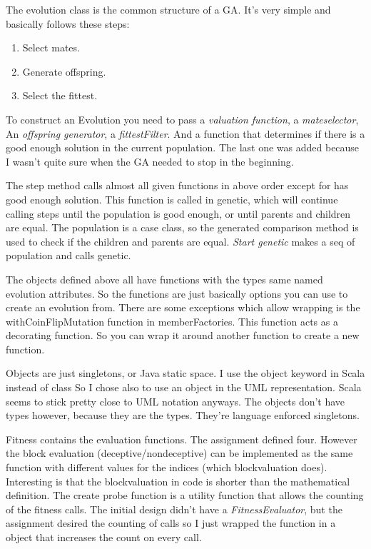 \documentclass{article}
\begin{document}
\begin{empfile}
The evolution class is the common structure of a GA{.} It's very simple and
basically follows these steps:
\begin{enumerate}
	\item Select mates.
	\item Generate offspring.
	\item Select the fittest.
\end{enumerate}

To construct an Evolution you need to pass a \emph{valuation function},
a \emph{mateselector}, An \emph{offspring generator}, 
a \emph{fittestFilter}. And a function that determines if there
is a good enough solution in the current population. The last one was added
because I wasn't quite sure when the GA needed to stop in the beginning.

The step method calls almost all given functions in above order except for has good
enough solution. This function is called in genetic, which will continue
calling steps until the population is good enough, or until parents
and children are equal. The population is a case class, so
the generated comparison method is used to check if the children and parents
are equal. \emph{Start genetic} makes a seq of population and calls genetic.

The objects defined above all have functions with the types same named evolution
attributes. So the functions are just basically options you can use to create an
evolution from. There are some exceptions which allow wrapping is the
withCoinFlipMutation function in
memberFactories. This function acts as a decorating function. So you can wrap
it around another function to create a new function.

Objects are just singletons, or Java static space. I use the object keyword in
Scala instead of class So I chose also to use an object in the UML
representation. Scala seems to stick pretty close to UML notation anyways.
The objects don't have types however, because they are the types. They're
language enforced singletons.

Fitness contains the evaluation functions. The assignment defined four. However
the block evaluation (deceptive/nondeceptive) can be implemented as the
same function with different values for the indices (which blockvaluation 
does). Interesting is that the blockvaluation in code is shorter than the
mathematical definition.
The create probe function is a utility function that allows the counting of
the fitness calls. The initial design didn't have a \emph{FitnessEvaluator},
but the assignment desired the counting of calls so I just wrapped the
function in a object that increases the count on every call.


\end{empfile}
\end{document}

